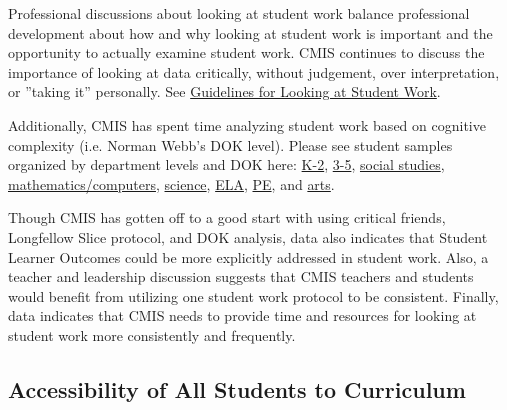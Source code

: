 \begin{findings}
Professional discussions about looking at student work  balance professional development about how and why looking at student work is important and the opportunity to actually examine student work.  CMIS continues to discuss the importance of looking at data critically, without judgement, over interpretation, or ”taking it” personally. See \href{https://docs.google.com/a/cmis.ac.th/document/d/18fMo-Cvgh0C2YHZjvZf71VkU5JehPuZDzFPQofcLUuI/edit?usp=sharing}{Guidelines for Looking at Student Work}. 

Additionally, CMIS has spent time analyzing student work based on cognitive complexity (i.e. Norman Webb’s DOK level). Please see student samples organized by department levels and DOK here: \href{https://drive.google.com/drive/folders/0ByVFfrm0zfoldHoxR0plT3dSNVE?usp=sharing}{K-2}, \href{https://drive.google.com/drive/folders/0ByVFfrm0zfolRVhuOFRoblRyVnM?usp=sharing}{3-5}, \href{https://drive.google.com/drive/folders/0ByVFfrm0zfolTnhLUU9iVVkxakU?usp=sharing}{social studies}, \href{https://drive.google.com/drive/folders/0ByVFfrm0zfolcUo4dDZYWkgwTEE?usp=sharing}{mathematics/computers}, \href{https://drive.google.com/drive/folders/0ByVFfrm0zfolb2ZYU0JBSnV2MFE?usp=sharing}{science}, \href{https://drive.google.com/drive/folders/0ByVFfrm0zfolVFVtT0luRUd0MlU?usp=sharing}{ELA}, \href{https://drive.google.com/drive/folders/0ByVFfrm0zfolV3VMR0JlNzhWSVU?usp=sharing}{PE}, and \href{https://drive.google.com/drive/folders/0ByVFfrm0zfolMTg0WFNPSzFsZnc?usp=sharing}{arts}. 


Though CMIS has gotten off to a good start with using critical friends, Longfellow Slice protocol, and DOK analysis, data also indicates that Student Learner Outcomes could be more explicitly addressed in student work. Also, a teacher and leadership discussion suggests that CMIS teachers and students would benefit from utilizing one student work protocol to be consistent. Finally, data indicates that CMIS needs to provide time and resources for  looking at student work more consistently and frequently. 
\end{findings}

\subsection{Accessibility of All Students to Curriculum}


